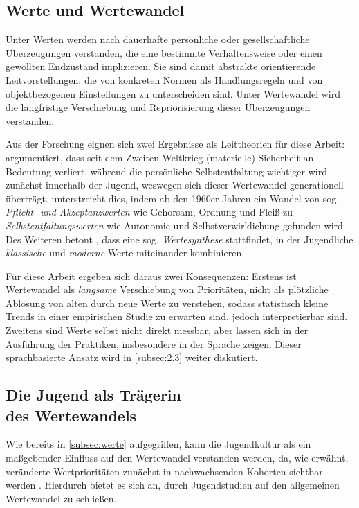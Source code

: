 \subsection{Werte und Wertewandel} \label{subsec:werte}
Unter Werten werden nach \textcite{Ro73} dauerhafte persönliche oder gesellschaftliche Überzeugungen verstanden, die eine bestimmte Verhaltensweise oder einen gewollten Endzustand implizieren.
Sie sind damit abstrakte orientierende Leitvorstellungen, die von konkreten Normen als Handlungsregeln und von objektbezogenen Einstellungen zu unterscheiden sind.
Unter Wertewandel wird die langfristige Verschiebung und Repriorisierung dieser Überzeugungen verstanden.

Aus der Forschung eignen sich zwei Ergebnisse als Leittheorien für diese Arbeit:
\textcite{Ing77} argumentiert, dass seit dem Zweiten Weltkrieg (materielle) Sicherheit an Bedeutung verliert, während die persönliche Selbstentfaltung wichtiger wird -- zunächst innerhalb der Jugend, weswegen sich dieser Wertewandel generationell überträgt.
\textcite{Kl84} unterstreicht dies, indem ab den 1960er Jahren ein Wandel von sog. \emph{Pflicht- und Akzeptanzwerten} wie Gehorsam, Ordnung und Fleiß zu \emph{Selbstentfaltungswerten} wie Autonomie und Selbstverwirklichung gefunden wird.
Des Weiteren betont \textcite{Kl84}, dass eine sog. \emph{Wertesynthese} stattfindet, in der Jugendliche \emph{klassische} und \emph{moderne} Werte miteinander kombinieren.

Für diese Arbeit ergeben sich daraus zwei Konsequenzen:
Erstens ist Wertewandel als \emph{langsame} Verschiebung von Prioritäten, nicht als plötzliche Ablösung von alten durch neue Werte zu verstehen, sodass statistisch kleine Trends in einer empirischen Studie zu erwarten sind, jedoch interpretierbar sind.
Zweitens sind Werte selbst nicht direkt messbar, aber lassen sich in der Ausführung der Praktiken, insbesondere in der Sprache zeigen.
Dieser sprachbasierte Ansatz wird in \autoref{subsec:2.3} weiter diskutiert.

\subsection[Die Jugend als Trägerin des Wertewandels]{Die Jugend als Trägerin\\ des Wertewandels}
Wie bereits in \autoref{subsec:werte} aufgegriffen, kann die Jugendkultur als ein maßgebender Einfluss auf den Wertewandel verstanden werden, da, wie erwähnt, veränderte Wertprioritäten zunächst in nachwachsenden Kohorten sichtbar werden \autocite{Ing77}.
Hierdurch bietet es sich an, durch Jugendstudien auf den allgemeinen Wertewandel zu schließen.

